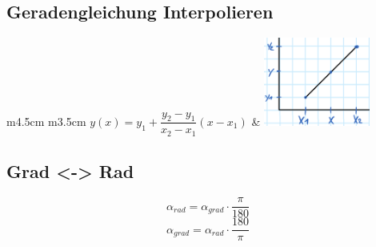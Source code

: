 %


\begin{minipage}{13cm}
	
	
\end{minipage}
\begin{minipage}{5cm}
	
\end{minipage}
\begin{multicols}{2}
	
	\columnbreak
	
	
\end{multicols}
\begin{multicols}{2}
	
	
	\columnbreak
	
	
\end{multicols}

\begin{minipage}{0.5\linewidth}
    \subsection{Geradengleichung Interpolieren}
    \begin{tabular}{m{4.5cm} m{3.5cm}}
       $ y(x)=y_1 + \dfrac{y_2 - y_1}{x_2 - x_1}(x-x_1) $ & 
       \includegraphics[width=3.5cm]{idiotenseite/images/interpolieren}\\      
    \end{tabular}         
\end{minipage}
\begin{minipage}{0.4\linewidth}
    \subsection{Grad <-> Rad}
    \[ \alpha_{rad}=\alpha_{grad}\cdot\dfrac{\pi}{180} \]
    \[ \alpha_{grad}=\alpha_{rad}\cdot\dfrac{180}{\pi} \]
\end{minipage}